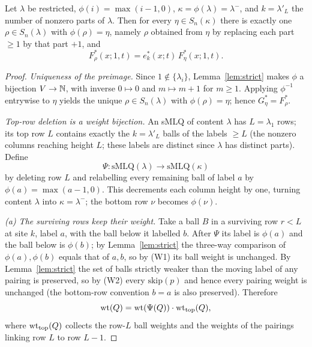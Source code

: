 \begin{qthreelemma}\label{lem:decrement}
Let $\lambda$ be restricted, $\phi(i)=\max(i-1,0)$, $\kappa=\phi(\lambda)=\lambda^-$,
and $k=\lambda'_L$ the number of nonzero parts of $\lambda$. Then for every
$\eta\in S_n(\kappa)$ there is exactly one $\rho\in S_n(\lambda)$ with
$\phi(\rho)=\eta$, namely $\rho$ obtained from $\eta$ by replacing each part $\ge1$
by that part $+1$, and
\[
F^*_\rho(x;1,t)=e^*_k(x;t)\,F^*_\eta(x;1,t).
\]
\end{qthreelemma}

\begin{proof}
\emph{Uniqueness of the preimage.} Since $1\notin\{\lambda_i\}$, Lemma~\ref{lem:strict}
makes $\phi$ a bijection $V\to\mathbb{N}$, with inverse $0\mapsto0$ and $m\mapsto m+1$
for $m\ge1$. Applying $\phi^{-1}$ entrywise to $\eta$ yields the unique
$\rho\in S_n(\lambda)$ with $\phi(\rho)=\eta$; hence $G^*_\eta=F^*_\rho$.

\emph{Top-row deletion is a weight bijection.} An sMLQ of content $\lambda$ has
$L=\lambda_1$ rows; its top row $L$ contains exactly the $k=\lambda'_L$ balls of
the labels $\ge L$ (the nonzero columns reaching height $L$; these labels are
distinct since $\lambda$ has distinct parts). Define
\[
\Psi:\mathrm{sMLQ}(\lambda)\longrightarrow\mathrm{sMLQ}(\kappa)
\]
by deleting row $L$ and relabelling every remaining ball of label $a$ by
$\phi(a)=\max(a-1,0)$. This decrements each column height by one, turning content
$\lambda$ into $\kappa=\lambda^-$; the bottom row $\nu$ becomes $\phi(\nu)$.

\emph{(a) The surviving rows keep their weight.} Take a ball $B$ in a surviving row
$r<L$ at site $k$, label $a$, with the ball below it labelled $b$. After $\Psi$ its
label is $\phi(a)$ and the ball below is $\phi(b)$; by Lemma~\ref{lem:strict} the
three-way comparison of $\phi(a),\phi(b)$ equals that of $a,b$, so by (W1) its ball
weight is unchanged. By Lemma~\ref{lem:strict} the set of balls strictly weaker
than the moving label of any pairing is preserved, so by (W2) every
$\mathrm{skip}(p)$ and hence every pairing weight is unchanged (the bottom-row
convention $b=a$ is also preserved). Therefore
\[
\operatorname{wt}(Q)=\operatorname{wt}(\Psi(Q))\cdot \operatorname{wt}_{\mathrm{top}}(Q),
\]
where $\operatorname{wt}_{\mathrm{top}}(Q)$ collects the row-$L$ ball weights and the
weights of the pairings linking row $L$ to row $L-1$.


\end{proof}
